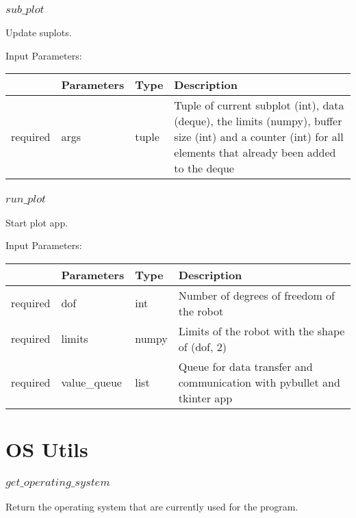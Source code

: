 \documentclass[
	ngerman,
	accentcolor=9c,%
	type=intern,
	marginpar=false
	]{tudapub}
\begin{document}
\vspace{0.5cm}

\subsubsection{$sub\_plot$}
\noindent Update suplots.


\vspace{0.5cm}
\noindent Input Parameters:
\vspace{0.5cm}

\begin{tabular}{|p{}|p{}|p{}| p{}|}
\hline
 & \textbf{Parameters} & \textbf{Type} & \textbf{Description} \\
\hline
required & args & tuple & Tuple of current subplot (int), data (deque), the limits (numpy), buffer size (int) and a counter (int) for all elements that already been added to the deque \\
\hline
\end{tabular}
\vspace{1cm}

\subsubsection{$run\_plot$}
\noindent Start plot app.


\vspace{0.5cm}
\noindent Input Parameters:
\vspace{0.5cm}

\begin{tabular}{|p{}|p{}|p{}| p{}|}
\hline
 & \textbf{Parameters} & \textbf{Type} & \textbf{Description} \\
\hline
required & dof & int & Number of degrees of freedom of the robot \\
\hline
required & limits & numpy & Limits of the robot with the shape of (dof, 2) \\
\hline
required & value\_queue & list & Queue for data transfer and communication with pybullet and tkinter app \\
\hline
\end{tabular}
\vspace{1cm}

\section{OS Utils}
\subsubsection{$get\_operating\_system$}
\noindent Return the operating system that are currently used for the program.
\end{document}
